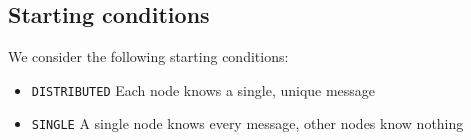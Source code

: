 \documentclass{article} %
\begin{document}
\subsection{Starting conditions}\label{subsec:startingconditions}
We consider the following starting conditions:
\begin{itemize}
\item \texttt{DISTRIBUTED} Each node knows a single, unique message
\item \texttt{SINGLE} A single node knows every message, other nodes know nothing
\end{itemize}



\end{document}
